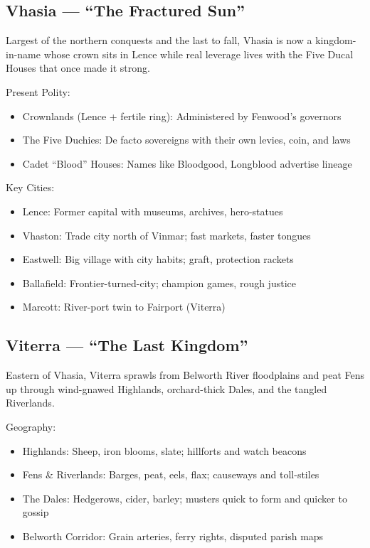 \subsection{Vhasia --- ``The Fractured Sun''}
\label{sec:vhasia}

Largest of the northern conquests and the last to fall, Vhasia is now a kingdom-in-name whose crown sits in Lence while real leverage lives with the Five Ducal Houses that once made it strong.

Present Polity:
\begin{itemize}
    \item Crownlands (Lence + fertile ring): Administered by Fenwood's governors
    \item The Five Duchies: De facto sovereigns with their own levies, coin, and laws
    \item Cadet ``Blood'' Houses: Names like Bloodgood, Longblood advertise lineage
\end{itemize}

Key Cities:
\begin{itemize}
    \item Lence: Former capital with museums, archives, hero-statues
    \item Vhaston: Trade city north of Vinmar; fast markets, faster tongues
    \item Eastwell: Big village with city habits; graft, protection rackets
    \item Ballafield: Frontier-turned-city; champion games, rough justice
    \item Marcott: River-port twin to Fairport (Viterra)
\end{itemize}

\subsection{Viterra --- ``The Last Kingdom''}
\label{sec:viterra}

Eastern of Vhasia, Viterra sprawls from Belworth River floodplains and peat Fens up through wind-gnawed Highlands, orchard-thick Dales, and the tangled Riverlands.

Geography:
\begin{itemize}
    \item Highlands: Sheep, iron blooms, slate; hillforts and watch beacons
    \item Fens \& Riverlands: Barges, peat, eels, flax; causeways and toll-stiles
    \item The Dales: Hedgerows, cider, barley; musters quick to form and quicker to gossip
    \item Belworth Corridor: Grain arteries, ferry rights, disputed parish maps
\end{itemize}

